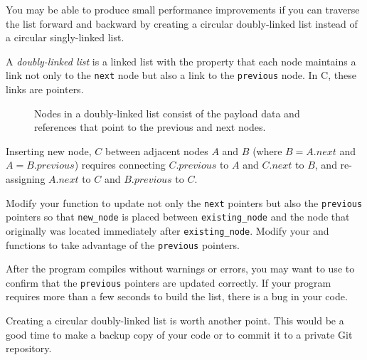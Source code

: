 You may be able to produce small performance improvements if you can traverse the list forward and backward by creating a circular doubly-linked list instead of a circular singly-linked list.

A \textit{doubly-linked list} is a linked list with the property that each node maintains a link not only to the \lstinline{next} node but also a link to the \lstinline{previous} node.
In C, these links are pointers.

\begin{figure}[h]
    \centering
    \caption{Nodes in a doubly-linked list consist of the payload data and references that point to the previous and next nodes.}\label{fig:doubly-linked-list}
\end{figure}

Inserting new node, $C$ between adjacent nodes $A$ and $B$ (where $B = A.next$ and $A = B.previous$) requires connecting $C.previous$ to $A$ and $C.next$ to $B$, and re-assigning $A.next$ to $C$ and $B.previous$ to $C$.

Modify your  function to update not only the \lstinline{next} pointers but also the \lstinline{previous} pointers so that \lstinline{new_node} is placed between \lstinline{existing_node} and the node that originally was located immediately after \lstinline{existing_node}.
Modify your  and  functions to take advantage of the \lstinline{previous} pointers.

After the program compiles without warnings or errors, you may want to use  to confirm that the \lstinline{previous} pointers are updated correctly.
If your program requires more than a few seconds to build the list, there is a bug in your code.

Creating a circular doubly-linked list is worth another point.
This would be a good time to make a backup copy of your code or to commit it to a private Git repository.

